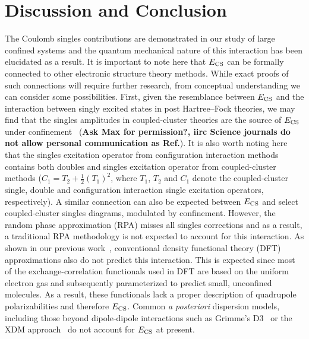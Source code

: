 \documentclass[aps,prl,groupaddress, twocolumn]{revtex4-1}  %
\begin{document}
\section*{Discussion and Conclusion}
The Coulomb singles contributions are demonstrated in our study of large confined systems and the quantum mechanical nature of this interaction has been elucidated as a result. It is important to note here that $E_{\rm CS}$ can be formally connected to other electronic structure theory methods. While exact proofs of such connections will require further research, from conceptual understanding we can consider some possibilities. First, given the resemblance between $E_{\rm CS}$ and the interaction between singly excited states in post Hartree--Fock theories, we may find that the singles amplitudes in coupled-cluster theories are the source of $E_{\rm CS}$ under confinement~\cite{connect_CC} (\textbf{Ask Max for permission?, iirc Science journals do not allow personal communication as Ref.}). It is also worth noting here that the singles excitation operator from configuration interaction methods contains both doubles and singles excitation operator from coupled-cluster methods ($C_1 = T_2 + \frac{1}{2}{(T_1)}^2$, where $T_1$, $T_2$ and $C_1$ denote the coupled-cluster single, double and configuration interaction single excitation operators, respectively). A similar connection can also be expected between $E_{\rm CS}$ and select coupled-cluster singles diagrams, modulated by confinement. However, the random phase approximation (RPA) misses all singles corrections and as a result, a traditional RPA methodology is not expected to account for this interaction. As shown in our previous work~\cite{sadhukhan_prl_2017}, conventional density functional theory (DFT) approximations also do not predict this interaction. This is expected since most of the exchange-correlation functionals used in DFT are  based on the uniform electron gas and subsequently parameterized to predict small, unconfined molecules. As a result, these functionals lack a proper description of quadrupole polarizabilities and therefore  $E_{\rm CS}$. Common \textit{a posteriori} dispersion models, including those beyond dipole-dipole interactions such as Grimme's D3~\cite{grimme_2010} or the XDM approach~\cite{becke_2006,angyan_2007,ayers_2009,heselmann_2009} do not account for $E_{\rm CS}$ at present.
\end{document}
